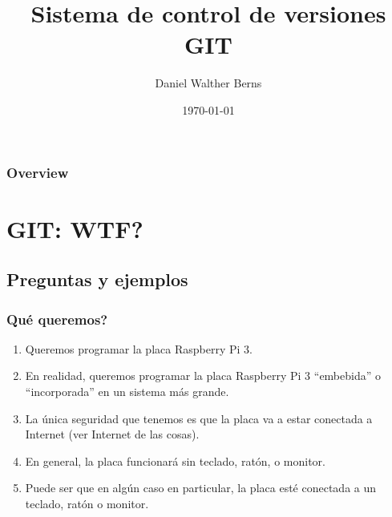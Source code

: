 \documentclass{beamer}
\title[GIT]{Sistema de control de versiones GIT} %
\author{Daniel Walther Berns} %
\institute[FI-UNPSJB] %
{
Departamento de Ingenier\'{\i}a Electr\'{o}nica - Facultad de Ingenier\'{\i}a 

\medskip

Universidad Nacional de la Patagonia San Juan Bosco \\ %

\medskip
\textit{daniel.w.berns@gmail.com} %
}
\date{\today} %
\begin{document}
\begin{frame}
\titlepage %
\end{frame}

\begin{frame}
\frametitle{Overview} %
\tableofcontents %
\end{frame}


\section{GIT: WTF?} 


\subsection{Preguntas y ejemplos} %

\begin{frame}
\frametitle{\textquestiondown Qu\'{e} queremos?}

\begin{enumerate}
\item<1-> Queremos programar la placa Raspberry Pi 3.
\item<2-> En realidad, queremos programar la placa Raspberry Pi 3 ``embebida'' o ``incorporada'' en un sistema m\'{a}s grande.
\item<3-> La \'{u}nica seguridad que tenemos es que la placa va a estar conectada a Internet (ver Internet de las cosas).
\item<4-> En general, la placa funcionar\'{a} sin teclado, rat\'{o}n, o monitor. 
\item<5-> Puede ser que en alg\'{u}n caso en particular, la placa est\'{e} conectada a un teclado, rat\'{o}n o monitor.
\end{enumerate}
\end{frame}
\end{document}
